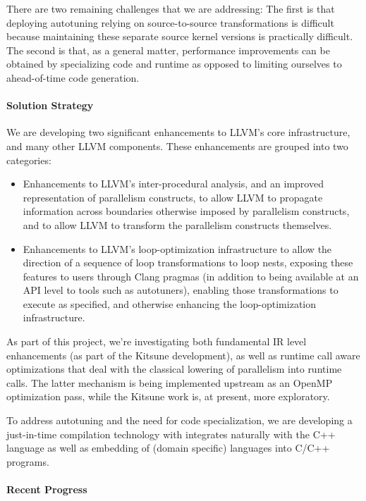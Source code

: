 There are two remaining challenges that we are addressing: The first is that deploying autotuning relying on source-to-source transformations is difficult because maintaining these separate source kernel versions is practically difficult. The second is that, as a general matter, performance improvements can be obtained by specializing code and runtime as opposed to limiting ourselves to ahead-of-time code generation.

\paragraph{Solution Strategy}
We are developing two significant enhancements to LLVM's core infrastructure, and many other LLVM components. These enhancements are grouped into two categories:
\begin{itemize}
\item Enhancements to LLVM's inter-procedural analysis, and an improved representation of parallelism constructs, to allow LLVM to propagate information across boundaries otherwise imposed by parallelism constructs, and to allow LLVM to transform the parallelism constructs themselves.
\item Enhancements to LLVM's loop-optimization infrastructure to allow the direction of a sequence of loop transformations to loop nests, exposing these features to users through Clang pragmas (in addition to being available at an API level to tools such as autotuners), enabling those transformations to execute as specified, and otherwise enhancing the loop-optimization infrastructure.
\end{itemize}

As part of this project, we're investigating both fundamental 
IR level enhancements (as part of the Kitsune development), as
well as runtime call aware optimizations that deal with the classical lowering
of parallelism into runtime calls. The latter mechanism is being implemented
upstream as an OpenMP optimization pass, while the Kitsune work is, at present,
more exploratory.

To address autotuning and the need for code specialization, we are developing a just-in-time compilation technology with integrates naturally with the C++ language as well as embedding of (domain specific) languages into C/C++ programs.

\paragraph{Recent Progress}

